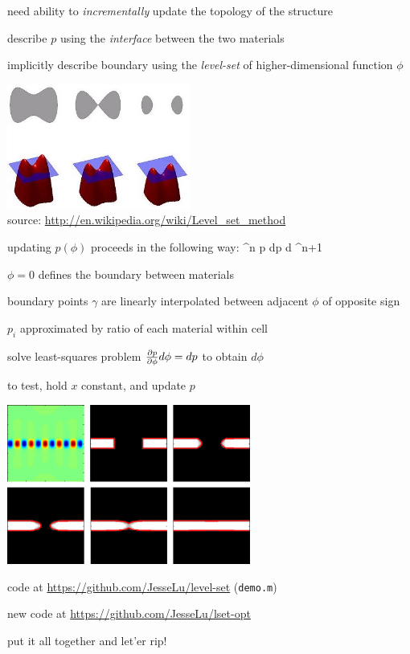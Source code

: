 \documentclass[landscape]{foils}
\renewcommand{\oursection}[1]{
\foilhead[-1.0cm]{#1}
}
\begin{document}
\BIT
\item need ability to \emph{incrementally} update the topology of the structure
\item describe $p$ using the \emph{interface} between the two materials
\item implicitly describe boundary using the \emph{level-set} of higher-dimensional function $\phi$
\begin{center}
\includegraphics[width=0.45\textwidth]{../figures/level-set.jpg} \\
source: \url{http://en.wikipedia.org/wiki/Level_set_method}
\end{center}
\EIT
\newpage

\BIT
\item updating $p(\phi)$ proceeds in the following way:
\BEQ
\phi^n  \gamma 
     p
     dp
     d\phi
     \phi^{n+1}
\EEQ
\item $\phi = 0$ defines the boundary between materials
\item boundary points $\gamma$ are linearly interpolated between adjacent $\phi$ of opposite sign
\item $p_i$ approximated by ratio of each material within cell
\item solve least-squares problem $\frac{\partial p}{\partial \phi} d\phi = dp$ to obtain $d\phi$
\EIT
\newpage

\BIT
\item to test, hold $x$ constant, and update $p$ 
\begin{center}
\includegraphics[width=0.6\textwidth]{../figures/structure-progression.jpg} \\
\end{center}
\item code at \url{https://github.com/JesseLu/level-set} (\texttt{demo.m})
\item new code at \url{https://github.com/JesseLu/lset-opt}
\EIT

\oursection{Example}
put it all together and let'er rip!
\end{document}
